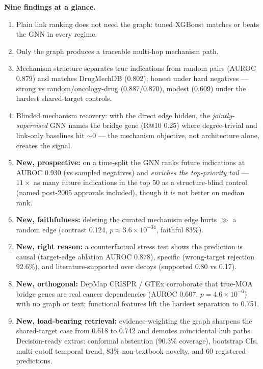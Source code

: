 \documentclass[11pt]{article}
\begin{document}
\begin{winbox}
\textbf{Nine findings at a glance.}
\begin{enumerate}[leftmargin=1.4em,itemsep=0pt,topsep=2pt]
\item Plain link ranking does not need the graph: tuned XGBoost matches or beats the GNN in every regime.
\item Only the graph produces a traceable multi-hop mechanism path.
\item Mechanism structure separates true indications from random pairs (AUROC 0.879) and matches DrugMechDB (0.802); honest under hard negatives --- strong vs random/oncology-drug (0.887/0.870), modest (0.609) under the hardest shared-target controls.
\item Blinded mechanism recovery: with the direct edge hidden, the \emph{jointly-supervised} GNN names the bridge gene (R@10 0.25) where degree-trivial and link-only baselines hit $\sim$0 --- the mechanism objective, not architecture alone, creates the signal.
\item \textbf{New, prospective:} on a time-split the GNN ranks future indications at AUROC 0.930 (vs sampled negatives) and \emph{enriches the top-priority tail} --- $11\times$ as many future indications in the top 50 as a structure-blind control (named post-2005 approvals included), though it is not better on median rank.
\item \textbf{New, faithfulness:} deleting the curated mechanism edge hurts $\gg$ a random edge (contrast 0.124, $p\approx3.6\times10^{-34}$, faithful 83\%).
\item \textbf{New, right reason:} a counterfactual stress test shows the prediction is causal (target-edge ablation AUROC 0.878), specific (wrong-target rejection 92.6\%), and literature-supported over decoys (supported 0.80 vs 0.17).
\item \textbf{New, orthogonal:} DepMap CRISPR / GTEx corroborate that true-MOA bridge genes are real cancer dependencies (AUROC 0.607, $p=4.6\times10^{-6}$) with no graph or text; functional features lift the hardest separation to 0.751.
\item \textbf{New, load-bearing retrieval:} evidence-weighting the graph sharpens the shared-target case from 0.618 to 0.742 and demotes coincidental hub paths. Decision-ready extras: conformal abstention (90.3\% coverage), bootstrap CIs, multi-cutoff temporal trend, 83\% non-textbook novelty, and 60 registered predictions.
\end{enumerate}
\end{winbox}
\end{document}
